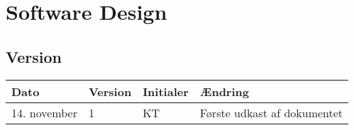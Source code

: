 \chapter{Software Design}

\section{Version}
\begin{table}[h]
	\centering
	\begin{tabularx}{\textwidth - 2cm}{|l|l| l|X|}
	\hline
	Dato	& Version	& Initialer & Ændring	\\ \hline
	14. november & 1 & KT	& Første udkast af dokumentet \\ \hline
	\end{tabularx}
\end{table}






